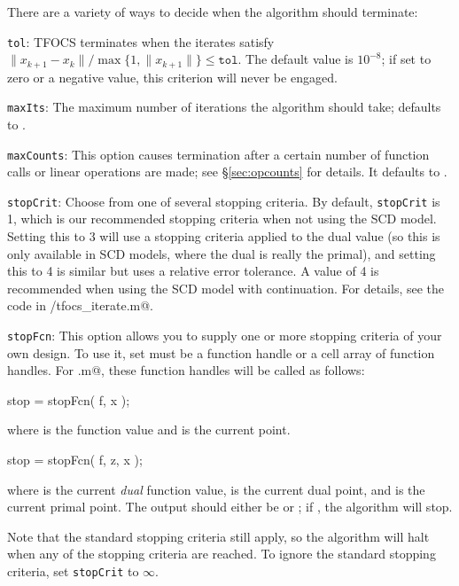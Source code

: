 \documentclass{article}
\newcommand{\<}{\langle}
\renewcommand{\>}{\rangle}
\begin{document}
There are a variety of ways to decide when the algorithm should terminate:
\begin{trivlist}
\item \texttt{tol}: TFOCS terminates when the iterates satisfy
$\|x_{k+1}-x_k\|/\max\{1,\|x_{k+1}\|\}\leq\texttt{tol}$.
The default value is $10^{-8}$; if set to zero or a negative value,
this criterion will never be engaged.
\item \texttt{maxIts}: The maximum number of iterations the algorithm
should take; defaults to \verb@Inf@.
\item \texttt{maxCounts}: This option causes termination after a certain
number of function calls or linear operations are made; see 
\S\ref{sec:opcounts}
for details. It defaults to \verb@Inf@.
\item \texttt{stopCrit}: Choose from one of several stopping criteria.
    By default, \texttt{stopCrit} is 1, which is our recommended stopping criteria
    when not using the SCD model.
    Setting this to 3 will use a stopping criteria applied to the dual value
    (so this is only available in SCD models, where the dual is really the primal),
    and setting this to 4 is similar but uses a relative error tolerance.
    A value of 4 is recommended when using the SCD model with continuation.
    For details, see the code in \verb@private/tfocs_iterate.m@.
\item \texttt{stopFcn}: This option allows you to supply one or more
stopping criteria of your own design. To use it, set \verb@stopFcn@
must be a function handle or a cell array of function handles. For
\verb@tfocs.m@, these function handles will be called as follows:
\begin{code}
	stop = stopFcn( f, x );
\end{code}
where \verb@f@ is the function value and \verb@x@ is the current point.
\begin{code}
	stop = stopFcn( f, z, x );
\end{code}
where \verb@f@ is the current \emph{dual} function value, \verb@z@ is
the current dual point, and  \verb@x@ is the current primal point.
The output should either be  \verb@true@ or \verb@false@; if
\verb@true@, the algorithm will stop.

Note that the standard stopping criteria still apply, so the algorithm will halt
when any of the stopping criteria are reached.  To ignore the standard stopping criteria,
set \texttt{stopCrit} to $\infty$.
\end{trivlist}
\end{document}

